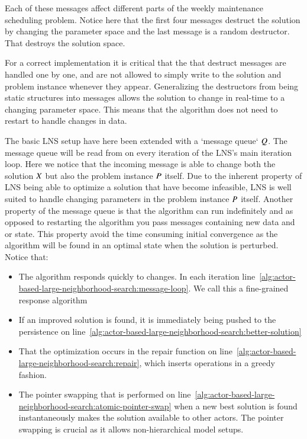 Each of these messages affect different parts of the weekly maintenance scheduling 
problem. Notice here that the first four messages destruct the solution by
changing the parameter space and the last message is a random destructor. That destroys
the solution space.

For a correct implementation it is critical that the that destruct messages are 
handled one by one, and are not allowed to simply write to the solution and
problem instance whenever they appear.
Generalizing the destructors from being static structures into messages allows
the solution to change in real-time to a changing parameter space. This means
that the algorithm does not need to restart to handle changes in data.




The basic LNS setup have here been extended with a `message queue` $Q$. The message
queue will be read from on every iteration of the LNS's main iteration loop.
Here we notice that the incoming message is able to change both the solution $X$
but also the problem instance $P$ itself. Due to the inherent property of LNS being
able to optimize a solution that have become infeasible, LNS is well suited to handle changing parameters 
in the problem instance $P$ itself. Another property of the message queue is 
that the algorithm can run indefinitely and as opposed to restarting the algorithm you
pass messages containing new data and or state. This property avoid the time consuming initial
convergence as the algorithm will be found in an optimal state when the
solution is perturbed. Notice that:

\begin{itemize}
    \item The algorithm responds quickly to changes. In each iteration line~\ref{alg:actor-based-large-neighborhood-search:message-loop}. We call this a fine-grained response algorithm
    \item If an improved solution is found, it is immediately being pushed to the persistence on line~\ref{alg:actor-based-large-neighborhood-search:better-solution}
    \item That the optimization occurs in the repair function on line~\ref{alg:actor-based-large-neighborhood-search:repair}, which inserts operations in a greedy fashion. 
	\item The pointer swapping that is performed on line~\ref{alg:actor-based-large-neighborhood-search:atomic-pointer-swap} when a new best solution is found instantaneously makes the solution available to other actors. The pointer swapping is crucial as it allows non-hierarchical model setups. 
\end{itemize}

